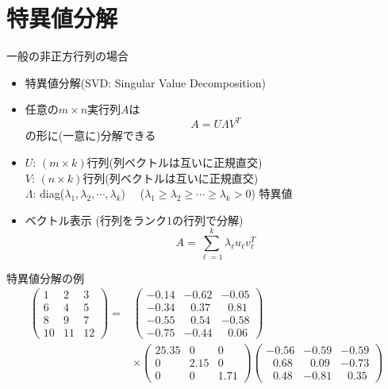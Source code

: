 \documentclass[dvipdfmx]{beamer}
\begin{document}
\section{特異値分解}

\begin{frame}[t,fragile]{一般の非正方行列の場合}
  \begin{itemize}
  \item 特異値分解(SVD: Singular Value Decomposition)
  \item 任意の$m \times n$実行列$A$は
    \[
    A = U \Lambda V^T
    \]
    の形に(一意に)分解できる
  \item $U$: $(m \times k)$行列(列ベクトルは互いに正規直交) \\
    $V$: $(n \times k)$行列(列ベクトルは互いに正規直交) \\
    $\Lambda$: diag($\lambda_1,\lambda_2,\cdots,\lambda_k$) \ \ ($\lambda_1\ge\lambda_2\ge\cdots\ge\lambda_k>0$) 特異値
  \item ベクトル表示 (行列をランク1の行列で分解)
    \[
    A = \sum_{\ell=1}^k \lambda_\ell u_\ell v_\ell^{T}
    \]
  \end{itemize}
\end{frame}

\begin{frame}[t,fragile]{特異値分解の例}
  \[
  \begin{split}
    \begin{pmatrix}
      1 & 2 & 3 \\
      6 & 4 & 5 \\
      8 & 9 & 7 \\
      10 & 11 & 12
    \end{pmatrix} =&
    \begin{pmatrix}
      -0.14 & -0.62 & -0.05 \\
      -0.34 & \ \ \,0.37 & \ \ \,0.81 \\
      -0.55 & \ \ \,0.54 & -0.58 \\
      -0.75 & -0.44 & \ \ \,0.06      
    \end{pmatrix} \\
    &\times
    \begin{pmatrix}
      25.35 & 0 & 0 \\
      0 & 2.15 & 0 \\
      0 & 0 & 1.71
    \end{pmatrix}
    \begin{pmatrix}
      -0.56 & -0.59 & -0.59 \\
      \ \ \,0.68 & \ \ \,0.09 & -0.73 \\
      \ \ \,0.48 & -0.81 & \ \ \,0.35
    \end{pmatrix}
  \end{split}
  \]
\end{frame}
\end{document}
